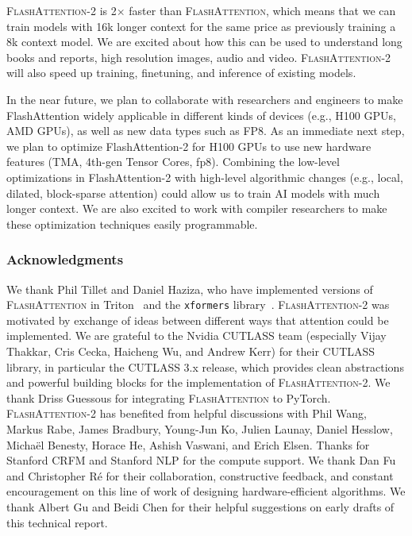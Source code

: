 \textsc{FlashAttention-2} is 2$\times$ faster than \textsc{FlashAttention}, which means that we can train models with 16k longer context for the same price as previously training a 8k context model. We are excited about how this can be used to understand long books and reports, high resolution images, audio and video.
\textsc{FlashAttention-2} will also speed up training, finetuning, and inference of existing models.

In the near future, we plan to collaborate with researchers and engineers to make FlashAttention widely applicable in different kinds of devices (e.g., H100 GPUs, AMD GPUs), as well as new data types such as FP8. As an immediate next step, we plan to optimize FlashAttention-2 for H100 GPUs to use new hardware features (TMA, 4th-gen Tensor Cores, fp8). Combining the low-level optimizations in FlashAttention-2 with high-level algorithmic changes (e.g., local, dilated, block-sparse attention) could allow us to train AI models with much longer context. We are also excited to work with compiler researchers to make these optimization techniques easily programmable.

\subsubsection*{Acknowledgments}

We thank Phil Tillet and Daniel Haziza, who have implemented versions of
\textsc{FlashAttention} in Triton~\citep{tillet2019triton} and the \texttt{xformers}
library~\citep{xFormers2022}.
\textsc{FlashAttention-2} was motivated by exchange of ideas between different ways that attention could be implemented. We are grateful to the Nvidia CUTLASS team (especially Vijay Thakkar, Cris Cecka, Haicheng Wu, and Andrew Kerr) for their CUTLASS library, in particular the CUTLASS 3.x release, which provides clean abstractions and powerful building blocks for the implementation of \textsc{FlashAttention-2}.
We thank Driss Guessous for integrating \textsc{FlashAttention} to PyTorch.
\textsc{FlashAttention-2} has benefited from helpful discussions with Phil Wang, Markus Rabe, James Bradbury, Young-Jun Ko, Julien Launay, Daniel Hesslow, Micha{\"e}l
Benesty, Horace He, Ashish Vaswani, and Erich Elsen. Thanks for Stanford CRFM and Stanford NLP for the compute support. We thank Dan Fu and Christopher R{\'e} for their collaboration, constructive feedback, and constant encouragement on this line of work of designing hardware-efficient algorithms. We thank Albert Gu and Beidi Chen for their helpful suggestions on early drafts of this technical report.


